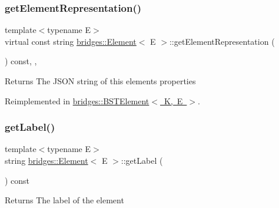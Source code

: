\subsubsection{\texorpdfstring{get\+Element\+Representation()}{getElementRepresentation()}}
{\footnotesize\ttfamily template$<$typename E$>$ \\
virtual const string \mbox{\hyperlink{classbridges_1_1_element}{bridges\+::\+Element}}$<$ E $>$\+::get\+Element\+Representation (\begin{DoxyParamCaption}{ }\end{DoxyParamCaption}) const\hspace{0.3cm}{\ttfamily [inline]}, {\ttfamily [protected]}, {\ttfamily [virtual]}}

\begin{DoxyReturn}{Returns}
The J\+S\+ON string of this element\textquotesingle{}s properties 
\end{DoxyReturn}


Reimplemented in \mbox{\hyperlink{classbridges_1_1_b_s_t_element_a623d1495a0d27090dc3fc515d148f381}{bridges\+::\+B\+S\+T\+Element$<$ K, E $>$}}.

\mbox{\label{classbridges_1_1_element_a38df6d5f1e0203dfa85b073b6756194e}} 
\subsubsection{\texorpdfstring{get\+Label()}{getLabel()}}
{\footnotesize\ttfamily template$<$typename E$>$ \\
string \mbox{\hyperlink{classbridges_1_1_element}{bridges\+::\+Element}}$<$ E $>$\+::get\+Label (\begin{DoxyParamCaption}{ }\end{DoxyParamCaption}) const\hspace{0.3cm}{\ttfamily [inline]}}

\begin{DoxyReturn}{Returns}
The label of the element 
\end{DoxyReturn}
\mbox{\label{classbridges_1_1_element_ac6fa7b04e28a1e9b8d8f2d395dd6e2c1}} 
